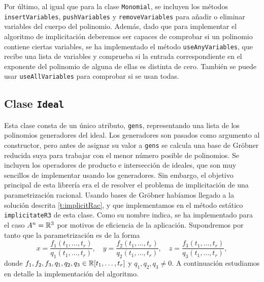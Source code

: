 Por último, al igual que para la clase \texttt{Monomial}, se incluyen los métodos  \texttt{insertVariables}, \texttt{pushVariables} y \texttt{removeVariables} para añadir o eliminar variables del cuerpo del polinomio. Además, dado que para implementar el algoritmo de implicitación deberemos ser capaces de comprobar si un polinomio contiene ciertas variables, se ha implementado el método \texttt{useAnyVariables}, que recibe una lista de variables y comprueba si la entrada correspondiente en el exponente del polinomio de alguna de ellas es distinta de cero. También se puede usar \texttt{useAllVariables} para comprobar si se usan todas.

\subsection{Clase \texttt{Ideal}}
Esta clase consta de un único atributo, \texttt{gens}, representando una lista de los polinomios generadores del ideal. Los generadores son pasados como argumento al constructor, pero antes de asignar su valor a \texttt{gens} se calcula una base de Gröbner reducida suya para trabajar con el menor número posible de polinomios. Se incluyen los operadores de producto e intersección de ideales, que son muy sencillos de implementar usando los generadores. Sin embargo, el objetivo principal de esta librería era el de resolver el problema de implicitación de una parametrización racional. Usando bases de Gröbner habíamos llegado a la solución descrita \autoref{t:implicitRac}, y que implementamos en el método estático \texttt{implicitateR3} de esta clase. Como su nombre indica, se ha implementado para el caso $A^n = \mathbb{R}^3$ por motivos de eficiencia de la aplicación. Supondremos por tanto que la parametrización es de la forma
\begin{equation*}
    x = \frac{f_1(t_1,\dots, t_r)}{q_1(t_1,\dots, t_r)},\quad
    y = \frac{f_2(t_1,\dots, t_r)}{q_2(t_1,\dots, t_r)},\quad
    z = \frac{f_3(t_1,\dots, t_r)}{q_3(t_1,\dots, t_r)},
\end{equation*}
donde $f_1,f_2,f_3,q_1,q_2,q_3 \in \mathbb{R}[t_1,\dots, t_r]$ y $q_1,q_2,q_3 \neq 0$. A continuación estudiamos en detalle la implementación del algoritmo.\newline

